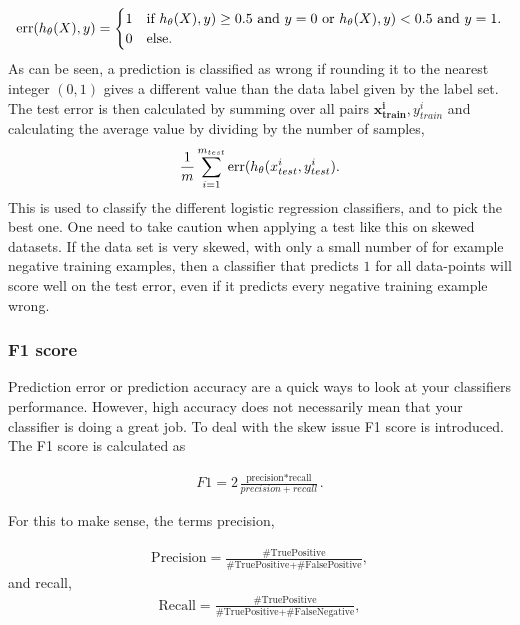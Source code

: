             \begin{align}
                \operatorname{err}(h_\theta(X),y) = 
                \begin{cases}
                    1 &\text{if } h_\theta(X),y) \geq 0.5 \text{ and } y = 0 \text{ or } h_\theta(X),y) < 0.5 \text{ and } y = 1. \\
                    0 &\text{else}.
                \end{cases}
                \label{eq:error_func}
            \end{align}
            As can be seen, a prediction is classified as wrong if rounding it to the nearest integer $(0,1)$ gives a different value than the data label given by the label set. The test error is then calculated by summing over all pairs $\bm{x_{train}^i}, y_{train}^i$ and calculating the average value by dividing by the number of samples, 
            \begin{align}
                \frac{1}{m} \sum_{i=1}^{m_{test}}\operatorname{err}(h_\theta(x_{test}^i,y_{test}^i).     
                \label{lr:testError}
            \end{align}
            This is used to classify the different logistic regression classifiers, and to pick the best one. One need to take caution when applying a test like this on skewed datasets. If the data set is very skewed, with only a small number of for example negative training examples, then a classifier that predicts $1$ for all data-points will score well on the test error, even if it predicts every negative training example wrong. 
            
            
        \subsubsection{F1 score}
            Prediction error or prediction accuracy are a quick ways to look at your classifiers performance. However, high accuracy does not necessarily mean that your classifier is doing a great job. To deal with the skew issue F1 score is introduced. The F1 score is calculated as
            
            \begin{align}
                F1 = 2\frac{\text{precision}*\text{recall}}{precision+recall}.
                \label{eq:f1_score}
            \end{align}
            
            For this to make sense, the terms precision, 
            
            \begin{align}
                \text{Precision} = \frac{\text{\#TruePositive}}{\text{\#TruePositive}+\text{\#FalsePositive}},
                \label{eq:precision}
            \end{align}
            and recall,
            \begin{align}
                \text{Recall} = \frac{\text{\#TruePositive}}{\text{\#TruePositive}+\text{\#FalseNegative}},
                \label{eq:recall}
            \end{align}
            
